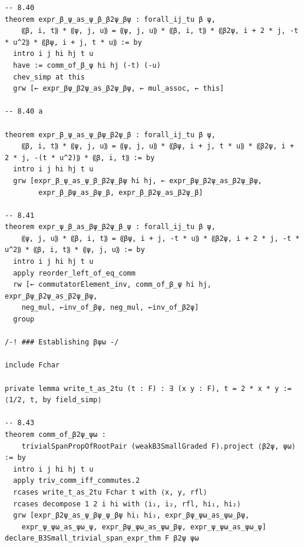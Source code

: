 \begin{Verbatim}
-- 8.40
theorem expr_β_ψ_as_ψ_β_β2ψ_βψ : forall_ij_tu β ψ,
    ⸨β, i, t⸩ * ⸨ψ, j, u⸩ = ⸨ψ, j, u⸩ * ⸨β, i, t⸩ * ⸨β2ψ, i + 2 * j, -t * u^2⸩ * ⸨βψ, i + j, t * u⸩ := by
  intro i j hi hj t u
  have := comm_of_β_ψ hi hj (-t) (-u)
  chev_simp at this
  grw [← expr_βψ_β2ψ_as_β2ψ_βψ, ← mul_assoc, ← this]

-- 8.40 a

theorem expr_β_ψ_as_ψ_βψ_β2ψ_β : forall_ij_tu β ψ,
    ⸨β, i, t⸩ * ⸨ψ, j, u⸩ = ⸨ψ, j, u⸩ * ⸨βψ, i + j, t * u⸩ * ⸨β2ψ, i + 2 * j, -(t * u^2)⸩ * ⸨β, i, t⸩ := by
  intro i j hi hj t u
  grw [expr_β_ψ_as_ψ_β_β2ψ_βψ hi hj, ← expr_βψ_β2ψ_as_β2ψ_βψ,
        expr_β_βψ_as_βψ_β, expr_β_β2ψ_as_β2ψ_β]

-- 8.41
theorem expr_ψ_β_as_βψ_β2ψ_β_ψ : forall_ij_tu β ψ,
    ⸨ψ, j, u⸩ * ⸨β, i, t⸩ = ⸨βψ, i + j, -t * u⸩ * ⸨β2ψ, i + 2 * j, -t * u^2⸩ * ⸨β, i, t⸩ * ⸨ψ, j, u⸩ := by
  intro i j hi hj t u
  apply reorder_left_of_eq_comm
  rw [← commutatorElement_inv, comm_of_β_ψ hi hj, expr_βψ_β2ψ_as_β2ψ_βψ,
    neg_mul, ←inv_of_βψ, neg_mul, ←inv_of_β2ψ]
  group

/-! ### Establishing βψω -/

include Fchar

private lemma write_t_as_2tu (t : F) : ∃ (x y : F), t = 2 * x * y := ⟨1/2, t, by field_simp⟩

-- 8.43
theorem comm_of_β2ψ_ψω :
    trivialSpanPropOfRootPair (weakB3SmallGraded F).project ⟨β2ψ, ψω⟩ := by
  intro i j hi hj t u
  apply triv_comm_iff_commutes.2
  rcases write_t_as_2tu Fchar t with ⟨x, y, rfl⟩
  rcases decompose 1 2 i hi with ⟨i₁, i₂, rfl, hi₁, hi₂⟩
  grw [expr_β2ψ_as_ψ_βψ_ψ_βψ hi₁ hi₂, expr_βψ_ψω_as_ψω_βψ,
    expr_ψ_ψω_as_ψω_ψ, expr_βψ_ψω_as_ψω_βψ, expr_ψ_ψω_as_ψω_ψ]
declare_B3Small_trivial_span_expr_thm F β2ψ ψω


\end{Verbatim}
